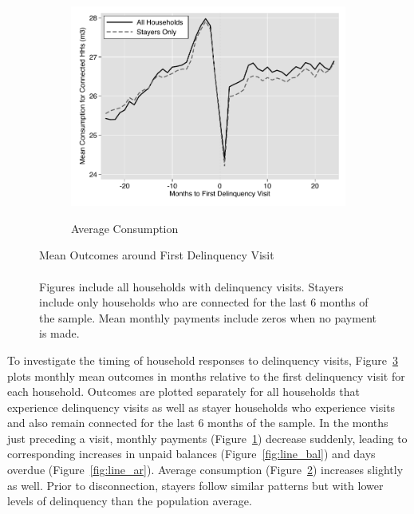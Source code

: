 \documentclass[12pt]{article}
\begin{document}
\begin{figure}[t!]
\begin{subfigure}[b]{0.49\textwidth}
        \label{fig:line_pay}
    \end{subfigure}
    \vskip 1mm \vskip 0pt
    \begin{subfigure}[b]{.49\textwidth}  
        \centering
        \caption[]{\small Average Consumption} 
        \vspace{-1mm}
        \includegraphics[width=\textwidth,trim={.2cm .2cm .2cm 0cm}, clip=true]{tables/line_c}  
        \label{fig:line_c}
    \end{subfigure}
    \hfill \hspace{.02\textwidth}
    \begin{minipage}{0.47\textwidth}   
    \vspace{-6cm}
    \caption[]
    {\small Mean Outcomes around First Delinquency Visit  \\  \\  Figures include all households with delinquency visits.  Stayers include only households who are connected for the last 6 months of the sample.  Mean monthly payments include zeros when no payment is made. } \label{fig:line_graphs}
    \end{minipage}
\end{figure} 


To investigate the timing of household responses to delinquency visits, Figure~\ref{fig:line_graphs} plots monthly mean outcomes in months relative to the first delinquency visit for each household.  Outcomes are plotted separately for all households that experience delinquency visits as well as stayer households who experience visits and also remain connected for the last 6 months of the sample.  In the months just preceding a visit, monthly payments (Figure~\ref{fig:line_pay}) decrease suddenly, leading to corresponding increases in unpaid balances (Figure~\ref{fig:line_bal}) and days overdue (Figure~\ref{fig:line_ar}).  Average consumption (Figure~\ref{fig:line_c}) increases slightly as well.  Prior to disconnection, stayers follow similar patterns but with lower levels of delinquency than the population average.
\end{document}
